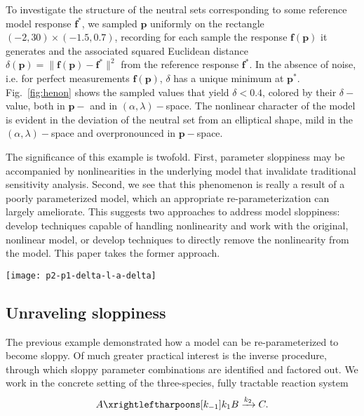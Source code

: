 To investigate the structure of the neutral sets corresponding to some
reference model response $\mathbf{f}^*$, we sampled $\mathbf{p}$
uniformly on the rectangle $(-2, 30) \times (-1.5, 0.7)$, recording
for each sample the response $\mathbf{f}(\mathbf{p})$ it generates and
the associated squared Euclidean distance
$\delta(\mathbf{p}) = \| \mathbf{f}(\mathbf{p}) - \mathbf{f}^* \|^2$
from the reference response $\mathbf{f}^*$.  In the absence of noise,
i.e. for perfect measurements $\mathbf{f}(\mathbf{p})$, $\delta$ has a
unique minimum at $\mathbf{p}^*$.  Fig.~\ref{fig:henon} shows the
sampled values that yield $\delta<0.4$, colored by their
$\delta-$value, both in $\mathbf{p}-$ and in $(\alpha,\lambda)-$space.
The nonlinear character of the model is evident in the deviation of
the neutral set from an elliptical shape, mild in the
$(\alpha,\lambda)-$space and overpronounced in $\mathbf{p}-$space.

The significance of this example is twofold.  First, parameter
sloppiness may be accompanied by nonlinearities in the underlying
model that invalidate traditional sensitivity analysis.  Second, we
see that this phenomenon is really a result of a poorly parameterized
model, which an appropriate re-parameterization can largely
ameliorate.  This suggests two approaches to address model sloppiness:
develop techniques capable of handling nonlinearity and work with the
original, nonlinear model, or develop techniques to directly remove
the nonlinearity from the model.  This paper takes the former
approach.

\begin{figure*}[ht!]
  \centering
  \texttt{[image: p2-p1-delta-l-a-delta]}
  \caption[H\'{e}non map transformed parameters and original
  parameters in nonlinear singularly perturbed system]{Parameter space colored by $\delta$; all points satisfy $\delta<0.4$. H\'{e}non map transformed parameters $w_4$ and $u_4$ (left), and original parameters $\alpha$ and $\lambda$ (right). Here, we used the classical values  $(\gamma,\zeta) = (1.4,0.3)$ for the H\'{e}non map. The central point at $\delta=0$ corresponds to $(\lambda^*, a^*) = (1, 1)$.
    \label{fig:henon} }
\end{figure*}

\subsection{Unraveling sloppiness} \label{sec:rr} The previous example
demonstrated how a model can be re-parameterized to become sloppy.  Of
much greater practical interest is the inverse procedure, through
which sloppy parameter combinations are identified and factored out.
We work in the concrete setting of the three-species, fully tractable
reaction system
% 
\begin{align}
  A
  \xrightleftharpoons[k_{-1}]{k_1}
  B
  \xrightarrow[]{k_2}
  C .
  \label{mech:abc}
\end{align}

